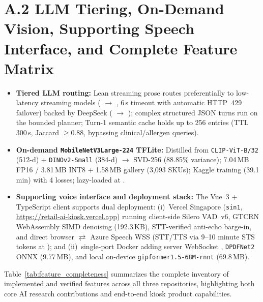 \section*{A.2 LLM Tiering, On-Demand Vision, Supporting Speech Interface, and Complete Feature Matrix}
\begin{itemize}
    \item \textbf{Tiered LLM routing:} Lean streaming prose routes preferentially to low-latency streaming models ( $\to$ , 6\,s timeout with automatic HTTP~429 failover) backed by DeepSeek ( $\to$ ); complex structured JSON turns run on the bounded planner; Turn-1 semantic cache holds up to 256 entries (TTL 300\,s, Jaccard $\ge 0.88$, bypassing clinical/allergen queries).
    \item \textbf{On-demand \texttt{MobileNetV3Large-224} TFLite:} Distilled from \texttt{CLIP-ViT-B/32} (512-d) + \texttt{DINOv2-Small} (384-d) $\to$ SVD-256 (88.85\% variance); 7.04\,MB FP16 / 3.81\,MB INT8 + 1.58\,MB gallery (3,093 SKUs); Kaggle training (39.1\,min) with 4 losses; lazy-loaded at .
    \item \textbf{Supporting voice interface and deployment stack:} The Vue~3 + TypeScript client supports dual deployment: (i)~Vercel Singapore (\texttt{sin1}, \url{https://retail-ai-kiosk.vercel.app}) running client-side Silero VAD~v6, GTCRN WebAssembly SIMD denoising (192.3\,KB), STT-verified anti-echo barge-in, and direct browser $\rightleftarrows$ Azure Speech WSS (STT/TTS via 9--10 minute STS tokens at ); and (ii)~single-port Docker adding server WebSocket , \texttt{DPDFNet2} ONNX (9.77\,MB), and local on-device \texttt{gipformer1.5-68M-rnnt} (69.8\,MB).
\end{itemize}

Table~\ref{tab:feature_completeness} summarizes the complete inventory of implemented and verified features across all three repositories, highlighting both core AI research contributions and end-to-end kiosk product capabilities.

